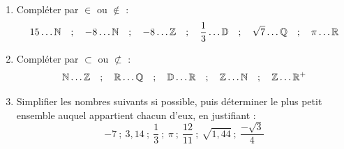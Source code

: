 \documentclass[10pt, a4paper]{article}
\begin{document}
\begin{Application}[][20 min]
\begin{enumerate}
    \item Compléter par  $\in$ ou $\notin$ :
    $$15 \dots \mathbb{N} \quad ; \quad -8 \dots \mathbb{N} \quad ; \quad -8 \dots \mathbb{Z} \quad ; \quad \dfrac{1}{3} \dots \mathbb{D} \quad ; \quad \sqrt{7} \dots \mathbb{Q} \quad ; \quad \pi \dots \mathbb{R}$$

    \item Compléter par  $\subset$ ou  $\not\subset$ :
    $$\mathbb{N} \dots \mathbb{Z} \quad ; \quad \mathbb{R} \dots \mathbb{Q} \quad ; \quad \mathbb{D} \dots \mathbb{R} \quad ; \quad \mathbb{Z} \dots \mathbb{N} \quad ; \quad 
    \mathbb{Z} \dots \mathbb{R}^+    $$

\item Simplifier les nombres suivants si possible, puis déterminer le plus petit ensemble auquel appartient chacun d'eux, en justifiant :
$$ -7 ~;~ 3{,}14 ~;~ \frac{1}{3} ~;~ \pi ~;~ \frac{12}{11} ~;~ \sqrt{1{,}44} ~;~ \frac{-\sqrt{3}}{4} $$
\end{enumerate}
\end{Application}
\end{document}
